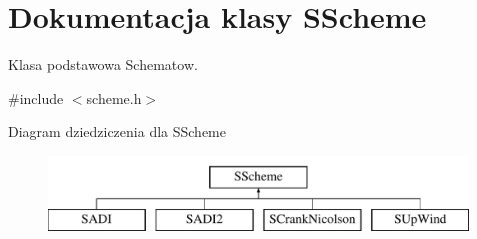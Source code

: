 \hypertarget{class_s_scheme}{}\section{Dokumentacja klasy S\+Scheme}
\label{class_s_scheme}


Klasa podstawowa Schematow.  




{\ttfamily \#include $<$scheme.\+h$>$}

Diagram dziedziczenia dla S\+Scheme\begin{figure}[H]
\begin{center}
\leavevmode
\includegraphics[height=2.000000cm]{class_s_scheme}
\end{center}
\end{figure}
